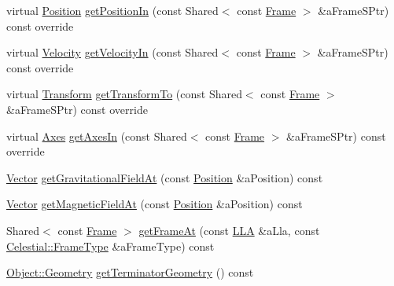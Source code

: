 \begin{DoxyCompactItemize}
\item 
virtual \hyperlink{classostk_1_1physics_1_1coord_1_1_position}{Position} \hyperlink{classostk_1_1physics_1_1env_1_1obj_1_1_celestial_af38fd0017fe14cfb6103684fcb1d3ee9}{get\+Position\+In} (const Shared$<$ const \hyperlink{classostk_1_1physics_1_1coord_1_1_frame}{Frame} $>$ \&a\+Frame\+S\+Ptr) const override
\item 
virtual \hyperlink{classostk_1_1physics_1_1coord_1_1_velocity}{Velocity} \hyperlink{classostk_1_1physics_1_1env_1_1obj_1_1_celestial_a748a113566d79c463e84bf62f05af83a}{get\+Velocity\+In} (const Shared$<$ const \hyperlink{classostk_1_1physics_1_1coord_1_1_frame}{Frame} $>$ \&a\+Frame\+S\+Ptr) const override
\item 
virtual \hyperlink{classostk_1_1physics_1_1coord_1_1_transform}{Transform} \hyperlink{classostk_1_1physics_1_1env_1_1obj_1_1_celestial_a8fa63af32cf8785ff6d3762d6f8dcd86}{get\+Transform\+To} (const Shared$<$ const \hyperlink{classostk_1_1physics_1_1coord_1_1_frame}{Frame} $>$ \&a\+Frame\+S\+Ptr) const override
\item 
virtual \hyperlink{classostk_1_1physics_1_1coord_1_1_axes}{Axes} \hyperlink{classostk_1_1physics_1_1env_1_1obj_1_1_celestial_a52b8cd88b947ca97f94981e5d3e10677}{get\+Axes\+In} (const Shared$<$ const \hyperlink{classostk_1_1physics_1_1coord_1_1_frame}{Frame} $>$ \&a\+Frame\+S\+Ptr) const override
\item 
\hyperlink{classostk_1_1physics_1_1data_1_1_vector}{Vector} \hyperlink{classostk_1_1physics_1_1env_1_1obj_1_1_celestial_adc8df9d860d30eb49600e644f63045bc}{get\+Gravitational\+Field\+At} (const \hyperlink{classostk_1_1physics_1_1coord_1_1_position}{Position} \&a\+Position) const
\item 
\hyperlink{classostk_1_1physics_1_1data_1_1_vector}{Vector} \hyperlink{classostk_1_1physics_1_1env_1_1obj_1_1_celestial_ae2cd7ac1cb6a896390394b77cffa0297}{get\+Magnetic\+Field\+At} (const \hyperlink{classostk_1_1physics_1_1coord_1_1_position}{Position} \&a\+Position) const
\item 
Shared$<$ const \hyperlink{classostk_1_1physics_1_1coord_1_1_frame}{Frame} $>$ \hyperlink{classostk_1_1physics_1_1env_1_1obj_1_1_celestial_a6cd5d134347840891174cff0729e53b9}{get\+Frame\+At} (const \hyperlink{classostk_1_1physics_1_1coord_1_1spherical_1_1_l_l_a}{L\+LA} \&a\+Lla, const \hyperlink{classostk_1_1physics_1_1env_1_1obj_1_1_celestial_ad005258cdc5969759c8a516fb1cfd262}{Celestial\+::\+Frame\+Type} \&a\+Frame\+Type) const
\item 
\hyperlink{classostk_1_1physics_1_1env_1_1_object_a66e44a65aefb23a184a6de531e96935d}{Object\+::\+Geometry} \hyperlink{classostk_1_1physics_1_1env_1_1obj_1_1_celestial_a4c594d934cf5c6a25795d6a992ea564f}{get\+Terminator\+Geometry} () const
\end{DoxyCompactItemize}

